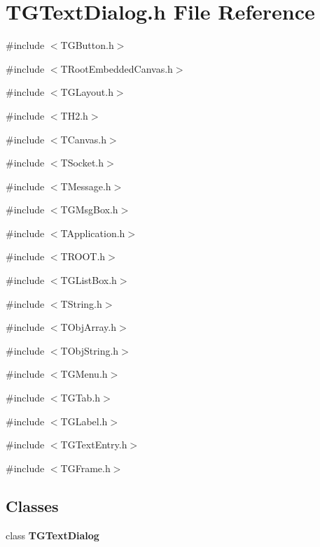 \section{TGTextDialog.h File Reference}
\label{TGTextDialog_8h}
{\ttfamily \#include $<$TGButton.h$>$}\par
{\ttfamily \#include $<$TRootEmbeddedCanvas.h$>$}\par
{\ttfamily \#include $<$TGLayout.h$>$}\par
{\ttfamily \#include $<$TH2.h$>$}\par
{\ttfamily \#include $<$TCanvas.h$>$}\par
{\ttfamily \#include $<$TSocket.h$>$}\par
{\ttfamily \#include $<$TMessage.h$>$}\par
{\ttfamily \#include $<$TGMsgBox.h$>$}\par
{\ttfamily \#include $<$TApplication.h$>$}\par
{\ttfamily \#include $<$TROOT.h$>$}\par
{\ttfamily \#include $<$TGListBox.h$>$}\par
{\ttfamily \#include $<$TString.h$>$}\par
{\ttfamily \#include $<$TObjArray.h$>$}\par
{\ttfamily \#include $<$TObjString.h$>$}\par
{\ttfamily \#include $<$TGMenu.h$>$}\par
{\ttfamily \#include $<$TGTab.h$>$}\par
{\ttfamily \#include $<$TGLabel.h$>$}\par
{\ttfamily \#include $<$TGTextEntry.h$>$}\par
{\ttfamily \#include $<$TGFrame.h$>$}\par
\subsection*{Classes}
\begin{DoxyCompactItemize}
\item 
class {\bf TGTextDialog}
\end{DoxyCompactItemize}
